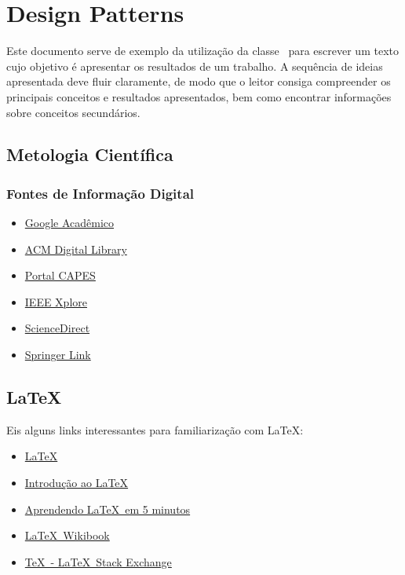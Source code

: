 \chapter{Design Patterns}%
Este documento serve de exemplo da utilização da classe \unbcic\ para escrever um texto cujo objetivo é apresentar os resultados de um trabalho. A sequência de ideias apresentada deve fluir claramente, de modo que o leitor consiga compreender os principais conceitos e resultados apresentados, bem como encontrar informações sobre conceitos secundários.

\section{Metologia Científica}

\subsection{Fontes de Informação Digital}
\begin{itemize}
	\item\href{http://scholar.google.com.br/}{Google Acadêmico}
	\item\href{http://dl.acm.org/}{ACM Digital Library}
	\item\href{http://www.periodicos.capes.gov.br/}{Portal CAPES}
	\item\href{http://ieeexplore.ieee.org/Xplore/home.jsp}{IEEE Xplore}
	\item\href{http://www.sciencedirect.com/}{ScienceDirect}
	\item\href{http://link.springer.com/}{Springer Link}
\end{itemize}

\section{\LaTeX}
Eis alguns links interessantes para familiarização com \LaTeX:
\begin{itemize}
	\item \href{http://www.latex-project.org/}{\LaTeX}
	\item \href{http://latexbr.blogspot.com.br/2010/04/introducao-ao-latex.html}{Introdução ao LaTeX}
	\item \href{https://bitbucket.org/rg3915/latex/downloads/aprendendo_latex_em_5_min.pdf}{Aprendendo \LaTeX\ em 5 minutos}
	\item \href{http://en.wikibooks.org/wiki/LaTeX}{\LaTeX\ Wikibook}
	\item \href{http://tex.stackexchange.com/}{\TeX\ - \LaTeX\ Stack Exchange}
\end{itemize}


